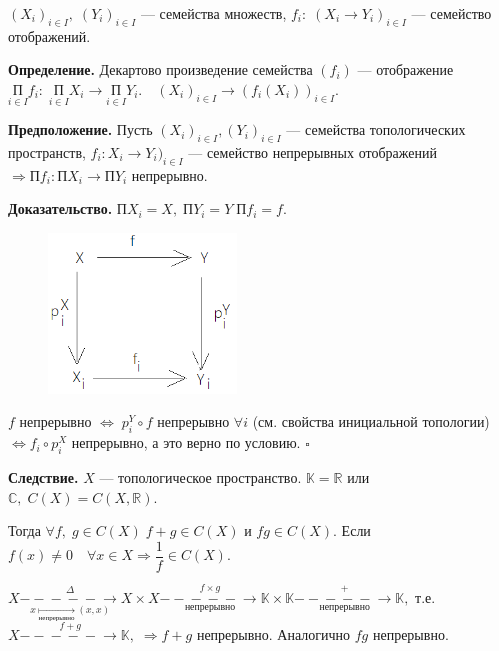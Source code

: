 \documentclass[12pt,a4paper]{article}
\begin{document}
$(X_{i})_{i \in I}, \; (Y_{i})_{i \in I}$ --- семейства множеств, $f_{i}: \; (X_{i} \to Y_{i})_{i \in I}$ --- семейство отображений. 

\textbf{Определение.} Декартово произведение семейства $(f_{i})$ --- отображение $\underset{i \in I}{\text{П}} f_{i}: \; \underset{i \in I}{\text{П}} X_{i} \to \underset{i \in I}{\text{П}} Y_{i}. \quad (X_{i})_{i \in I} \to (f_{i}(X_{i}))_{i \in I}.$

\textbf{Предположение.} Пусть $(X_{i})_{i \in I}, (Y_{i})_{i \in I}$ --- семейства топологических пространств, $f_{i}: X_{i} \to Y_{i})_{i \in I}$ --- семейство непрерывных отображений $\Rightarrow \text{П} f_{i}: \text{П} X_{i} \to \text{П} Y_{i}$ непрерывно. 

\textbf{Доказательство.} П$X_{i} = X, \; \text{П}Y_{i} = Y \; \text{П} f_{i} = f.$

\begin{figure}
	\includegraphics[width = 5cm]{lect7_1.png}
\end{figure}

$f$ непрерывно $\Leftrightarrow \; p_{i}^{Y} \circ f$ непрерывно $\forall i$ (см. свойства инициальной топологии) $\Leftrightarrow f_{i} \circ p_{i}^{X}$ непрерывно, а это верно по условию. $\square$ 

\textbf{Следствие.} $X$ --- топологическое пространство. $\mathbb{K} = \mathbb{R}$ или $\mathbb{C}, \; C(X) = C(X, \mathbb{R}).$

Тогда $\forall f, \; g \in C(X) \; f + g \in C(X)$ и $fg \in C(X).$ Если $f(x) \neq 0 \quad \forall x \in X \Rightarrow \dfrac{1}{f} \in C(X).$ 

$X \underset{x \underset{\text{непрерывно}}{\mapsto} (x, x)}{\overset{\Delta}{-\!\!\!-\!\!\!-\!\!\!-\!\!\!-\!\!\!\to}}X \times X \underset{\text{непрерывно}}{\overset{f \times g}{-\!\!\!-\!\!\!-\!\!\!-\!\!\!-\!\!\!\to}} \mathbb{K} \times \mathbb{K} \underset{\text{непрерывно}}{\overset{+}{-\!\!\!-\!\!\!-\!\!\!-\!\!\!-\!\!\!\to}} \mathbb{K},$ т.е. $X \overset{f + g}{-\!\!\!-\!\!\!-\!\!\!-\!\!\!-\!\!\!\to} \mathbb{K}, \; \Rightarrow f + g$ непрерывно. Аналогично $fg$ непрерывно. 
\end{document}
